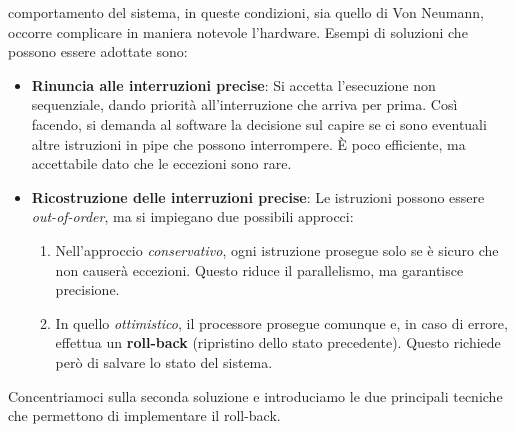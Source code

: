 comportamento del sistema, in queste condizioni, sia quello di Von Neumann, occorre complicare in maniera notevole l'hardware. Esempi di soluzioni che possono essere adottate sono:
\begin{itemize}
    \item \textbf{Rinuncia alle interruzioni precise}: Si accetta l'esecuzione non sequenziale, dando priorità all'interruzione che arriva per prima. Così facendo, si demanda al software la decisione sul capire se ci sono eventuali altre istruzioni in pipe che possono interrompere. È poco efficiente, ma accettabile dato che le eccezioni sono rare.
    \item \textbf{Ricostruzione delle interruzioni precise}: Le istruzioni possono essere \textit{out-of-order}, ma si impiegano due possibili approcci:
    \begin{enumerate}
        \item Nell'approccio \textit{conservativo}, ogni istruzione prosegue solo se è sicuro che non causerà eccezioni. Questo riduce il parallelismo, ma garantisce precisione.
        \item In quello \textit{ottimistico}, il processore prosegue comunque e, in caso di errore, effettua un \textbf{roll-back} (ripristino dello stato precedente). Questo richiede però di salvare lo stato del sistema.
    \end{enumerate}
\end{itemize}
Concentriamoci sulla seconda soluzione e introduciamo le due principali tecniche che permettono di implementare il roll-back.

